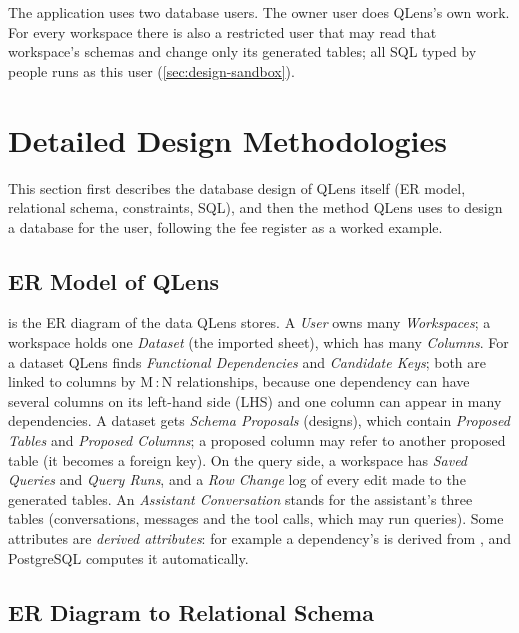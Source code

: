 The application uses two database users. The owner user  does QLens's own work. For
every workspace there is also a restricted user  that may read that
workspace's schemas and change only its generated tables; all SQL typed by people runs as this user
(\cref{sec:design-sandbox}).

\section{Detailed Design Methodologies}
\label{sec:detailed}

This section first describes the database design of QLens itself (ER model, relational schema,
constraints, SQL), and then the method QLens uses to design a database for the user, following the fee
register as a worked example.

\subsection{ER Model of QLens}
\label{sec:db-er}

 is the ER diagram of the data QLens stores. A \emph{User} owns many \emph{Workspaces}; a
workspace holds one \emph{Dataset} (the imported sheet), which has many \emph{Columns}. For a dataset
QLens finds \emph{Functional Dependencies} and \emph{Candidate Keys}; both are linked to columns by M\,:\,N
relationships, because one dependency can have several columns on its left-hand side (LHS) and one
column can appear in many dependencies. A dataset gets \emph{Schema Proposals} (designs), which contain
\emph{Proposed Tables} and \emph{Proposed Columns}; a proposed column may refer to another proposed table
(it becomes a foreign key). On the query side, a workspace has \emph{Saved Queries} and \emph{Query
Runs}, and a \emph{Row Change} log of every edit made to the generated tables. An \emph{Assistant
Conversation} stands for the assistant's three tables (conversations, messages and the tool calls, which
may run queries). Some attributes are
\emph{derived attributes}: for example a dependency's  is derived from
, and PostgreSQL computes it automatically.


\subsection{ER Diagram to Relational Schema}
\label{sec:db-schema}

